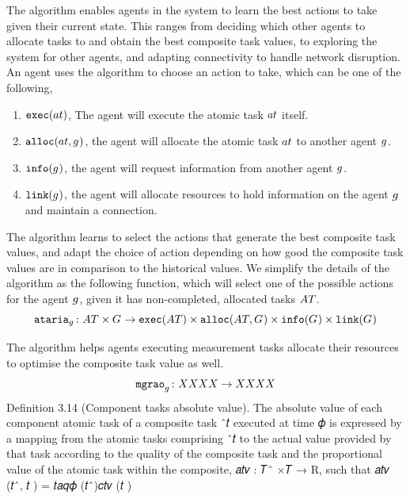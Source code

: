 The \acronymATARIAExtended{}{} algorithm enables agents in the system to learn the best actions to take given their current state. This ranges from deciding which other agents to allocate tasks to and obtain the best composite task values, to exploring the system for other agents, and adapting connectivity to handle network disruption. An agent uses the \acronymATARIA{}{} algorithm to choose an action to take, which can be one of the following,
\begin{enumerate}
	\item $\functionExec{}{}$, The agent will execute the atomic task $\varAtomicTask{}{}$ itself.
	\item $\functionAlloc{}{}$, the agent will allocate the atomic task $\varAtomicTask{}{}$ to another agent $g_{}^{}$.
	\item $\texttt{info}(g_{}^{})$, the agent will request information from another agent $g_{}^{}$.
	\item $\texttt{link}(g_{}^{})$, the agent will allocate resources to hold information on the agent $g_{}^{}$ and maintain a connection.
\end{enumerate}
The \acronymATARIA{}{} algorithm learns to select the actions that generate the best composite task values, and adapt the choice of action depending on how good the composite task values are in comparison to the historical values. We simplify the details of 
the algorithm as the following function, which will select one of the possible actions for the agent $g_{}^{}$, given it has non-completed, allocated tasks $\setAtomicTask{}{}$.
\begin{equation}
	\label{eq:ataria}
	\formalATARIA{}{}
\end{equation}

The \acronymMGRAOExtended{}{} algorithm helps agents executing measurement tasks allocate their resources to optimise the composite task value as well. 
\begin{equation}
	\label{eq:mgrao}
	\formalMGRAO{}{}
\end{equation}
Definition 3.14 (Component tasks absolute value). The absolute value of each component atomic task of a composite
task ˆ𝑡 executed at time 𝜙 is expressed by a mapping from the atomic tasks comprising ˆ𝑡 to the actual value provided
by that task according to the quality of the composite task and the proportional value of the atomic task within the
composite, 𝑎𝑡𝑣 : 𝑇ˆ ×𝑇 → R, such that 𝑎𝑡𝑣 (𝑡ˆ, 𝑡 ) = 𝑡𝑎𝑞𝜙 (𝑡ˆ)𝑐𝑡𝑣 (𝑡 )


